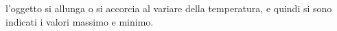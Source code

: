 l'oggetto si allunga o si accorcia al variare 
				della temperatura, e quindi si sono indicati 
				i valori massimo e minimo.